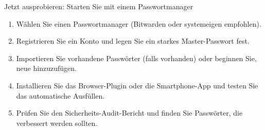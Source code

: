 \begin{tcbpractice}{Jetzt ausprobieren: Starten Sie mit einem Passwortmanager}
\begin{enumerate}
  \item Wählen Sie einen Passwortmanager (Bitwarden oder systemeigen empfohlen).
  \item Registrieren Sie ein Konto und legen Sie ein starkes Master-Passwort fest.
  \item Importieren Sie vorhandene Passwörter (falls vorhanden) oder beginnen Sie, neue hinzuzufügen.
  \item Installieren Sie das Browser-Plugin oder die Smartphone-App und testen Sie das automatische Ausfüllen.
  \item Prüfen Sie den Sicherheits-Audit-Bericht und finden Sie Passwörter, die verbessert werden sollten.
\end{enumerate}

\end{tcbpractice}
